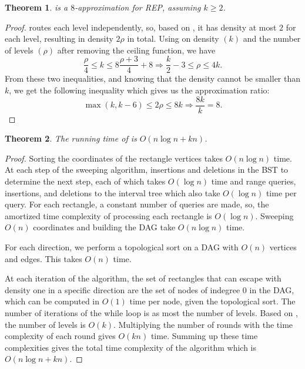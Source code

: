 \documentclass[preprint,12pt]{elsarticle}
\newtheorem{theorem}{Theorem}
\begin{document}
\begin{theorem}\label{theorem:greedy}
 is a $8$-approximation for REP, assuming $k\geq 2$.
\end{theorem}
\begin{proof}
 routes each level independently, so, based on , it has density at most $2$ for each level, resulting in density $2\rho$ in total.
Using  on density $(k)$ and the number of levels $(\rho)$ after removing the ceiling function, we have
\[
\frac{\rho}{4} \leq k \leq 8\frac{\rho+3}{4}+8 \Rightarrow \frac{k}{2}-3 \leq \rho \leq 4k.
\]
From these two inequalities, and knowing that the density cannot be smaller than $k$, we get the following inequality which gives us the approximation ratio:
\[
\max(k,k-6) \leq 2\rho \leq 8k \Rightarrow \frac{8k}{k} =8.
\]
\end{proof}

\begin{theorem}\label{theorem:time}
The running time of  is $O(n\log n+kn)$.
\end{theorem}
\begin{proof}
Sorting the coordinates of the rectangle vertices takes $O(n\log n)$ time.
At each step of the sweeping algorithm, insertions and deletions in the BST to determine the next step, each of which takes $O(\log n)$ time and range queries, insertions, and deletions to the interval tree which also take $O(\log n)$ time per query. For each rectangle, a constant number of queries are made, so, the amortized time complexity of processing each rectangle is $O(\log n)$.
Sweeping $O(n)$ coordinates and building the DAG take $O(n\log n)$ time.

For each direction, we perform a topological sort on a DAG with $O(n)$ vertices and edges. This takes $O(n)$ time.

At each iteration of the algorithm, the set of rectangles that can escape with density one in a specific direction are the set of nodes of indegree $0$ in the DAG, which can be computed in $O(1)$ time per node, given the topological sort.
The number of iterations of the while loop is as most the number of levels.
Based on , the number of levels is $O(k)$. Multiplying the number of rounds with the time complexity of each round gives $O(kn)$ time.
Summing up these time complexities gives the total time complexity of the algorithm which is $O(n\log n+kn)$.
\end{proof}
\end{document}
